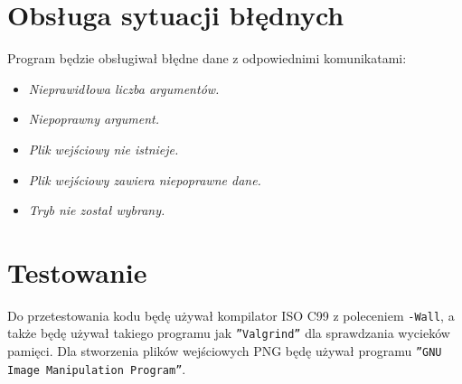 \documentclass[a4paper, 12pt]{article}
\begin{document}
	\section{Obsługa sytuacji błędnych}
		\hspace{1cm} Program będzie obsługiwał błędne dane z odpowiednimi komunikatami:
		\renewcommand{\labelitemi}{$\ast$}
		
		\begin{itemize}
			\item \textit{Nieprawidłowa liczba argumentów.}
 			\item \textit{Niepoprawny argument.}
 			\item \textit{Plik wejściowy nie istnieje.}
 			\item \textit{Plik wejściowy zawiera niepoprawne dane.}
 			\item \textit{Tryb nie został wybrany.}
		\end{itemize}
\newpage
	\section{Testowanie}
		\hspace{1cm} Do przetestowania kodu będę używał kompilator ISO C99 z poleceniem \texttt{-Wall}, a także będę używał takiego programu jak \texttt{''Valgrind''} dla sprawdzania wycieków pamięci. Dla stworzenia plików wejściowych PNG będę używał programu \texttt{''GNU Image Manipulation Program''}.
\label{LastPage}~
\label{LastPageOfBackMatter}~		
\end{document}
